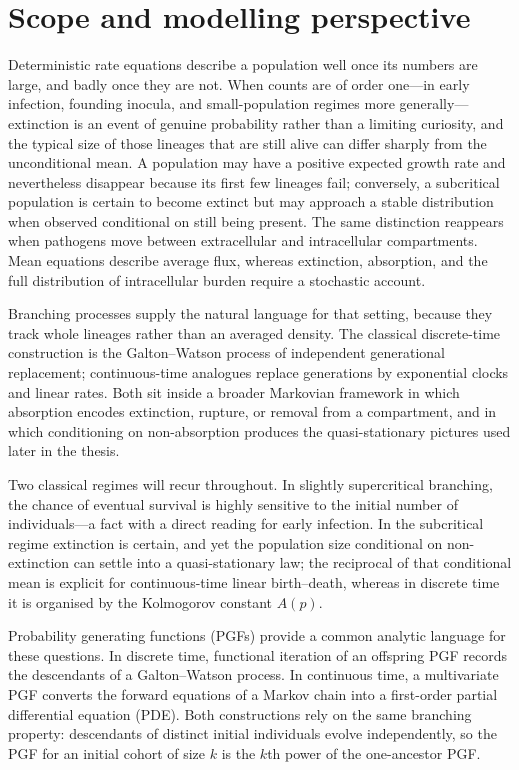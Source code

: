 \section{Scope and modelling perspective}
\label{sec:scope}

Deterministic rate equations describe a population well once its numbers are large, and badly once they are not.  When counts are of order one---in early infection, founding inocula, and small-population regimes more generally---extinction is an event of genuine probability rather than a limiting curiosity, and the typical size of those lineages that are still alive can differ sharply from the unconditional mean.  A population may have a positive expected growth rate and nevertheless disappear because its first few lineages fail; conversely, a subcritical population is certain to become extinct but may approach a stable distribution when observed conditional on still being present.  The same distinction reappears when pathogens move between extracellular and intracellular compartments.  Mean equations describe average flux, whereas extinction, absorption, and the full distribution of intracellular burden require a stochastic account.

Branching processes supply the natural language for that setting, because they track whole lineages rather than an averaged density.  The classical discrete-time construction is the Galton--Watson process of independent generational replacement; continuous-time analogues replace generations by exponential clocks and linear rates.  Both sit inside a broader Markovian framework in which absorption encodes extinction, rupture, or removal from a compartment, and in which conditioning on non-absorption produces the quasi-stationary pictures used later in the thesis.

Two classical regimes will recur throughout.  In slightly supercritical branching, the chance of eventual survival is highly sensitive to the initial number of individuals---a fact with a direct reading for early infection.  In the subcritical regime extinction is certain, and yet the population size conditional on non-extinction can settle into a quasi-stationary law; the reciprocal of that conditional mean is explicit for continuous-time linear birth--death, whereas in discrete time it is organised by the Kolmogorov constant $A(p)$.

Probability generating functions (PGFs) provide a common analytic language for these questions.  In discrete time, functional iteration of an offspring PGF records the descendants of a Galton--Watson process.  In continuous time, a multivariate PGF converts the forward equations of a Markov chain into a first-order partial differential equation (PDE).  Both constructions rely on the same branching property: descendants of distinct initial individuals evolve independently, so the PGF for an initial cohort of size $k$ is the $k$th power of the one-ancestor PGF\@.

